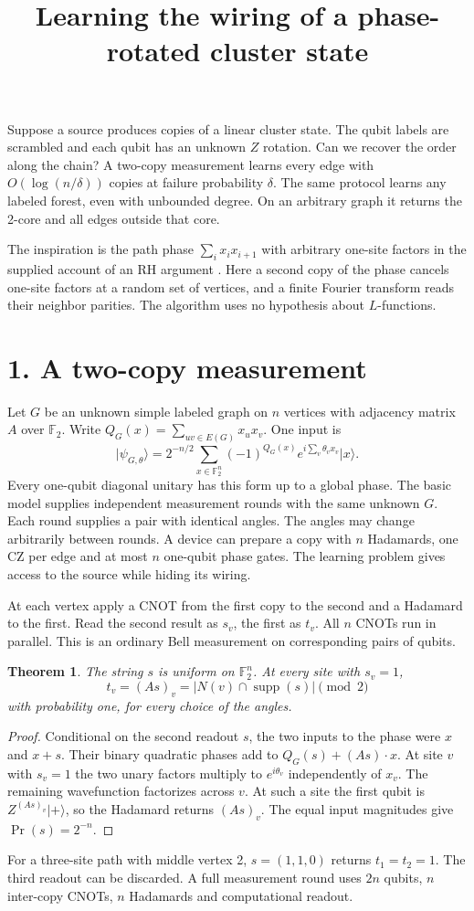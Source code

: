 \documentclass[11pt]{article}
\title{Learning the wiring of a phase-rotated cluster state}
\author{}\date{}
\newtheorem*{theorem}{Theorem}
\newcommand{\F}{\mathbb F_2}
\newcommand{\ket}[1]{\lvert #1\rangle}
\newcommand{\supp}{\operatorname{supp}}
\begin{document}
\maketitle
\vspace{-2.8em}
Suppose a source produces copies of a linear cluster state. The qubit
labels are scrambled and each qubit has an unknown $Z$ rotation. Can we
recover the order along the chain? A two-copy measurement learns every
edge with $O(\log(n/\delta))$ copies at failure probability $\delta$.
The same protocol learns any labeled forest, even with unbounded degree.
On an arbitrary graph it returns the 2-core and all edges outside that core.

The inspiration is the path phase $\sum_i x_ix_{i+1}$ with arbitrary
one-site factors in the supplied account of an RH argument \cite{remark}.
Here a second copy of the phase cancels one-site factors at a random
set of vertices, and a finite Fourier transform reads their neighbor parities.
The algorithm uses no hypothesis about $L$-functions.

\section*{1. A two-copy measurement}
Let $G$ be an unknown simple labeled graph on $n$ vertices with adjacency
matrix $A$ over $\F$. Write $Q_G(x)=\sum_{uv\in E(G)}x_ux_v$. One input is
\[
 \ket{\psi_{G,\theta}}=2^{-n/2}\sum_{x\in\F^n}
 (-1)^{Q_G(x)} e^{i\sum_v\theta_v x_v}\ket{x}.
\]
Every one-qubit diagonal unitary has this form up to a global phase. The
basic model supplies independent measurement rounds with the same unknown
$G$. Each round supplies a pair with identical angles. The angles may
change arbitrarily between rounds. A device can prepare a copy with
$n$ Hadamards, one CZ per edge and at most $n$ one-qubit phase gates.
The learning problem gives access to the source while hiding its wiring.

At each vertex apply a CNOT from the first copy to the second and a
Hadamard to the first. Read the second result as $s_v$, the first as $t_v$.
All $n$ CNOTs run in parallel. This is an ordinary Bell measurement on
corresponding pairs of qubits.
\begin{theorem}
The string $s$ is uniform on $\F^n$. At every site with $s_v=1$,
\[
 t_v=(As)_v=\big|N(v)\cap\supp(s)\big|\pmod 2
\]
with probability one, for every choice of the angles.
\end{theorem}
\begin{proof}
Conditional on the second readout $s$, the two inputs to the phase were
$x$ and $x+s$. Their binary quadratic phases add to
$Q_G(s)+(As)\cdot x$. At site $v$ with $s_v=1$ the two unary factors
multiply to $e^{i\theta_v}$ independently of $x_v$. The remaining
wavefunction factorizes across $v$. At such a site the first qubit is
$Z^{(As)_v}\ket{+}$, so the Hadamard returns $(As)_v$. The equal
input magnitudes give $\Pr(s)=2^{-n}$.
\end{proof}
For a three-site path with middle vertex 2, $s=(1,1,0)$ returns $t_1=t_2=1$.
The third readout can be discarded. A full measurement round uses $2n$
qubits, $n$ inter-copy CNOTs, $n$ Hadamards and computational readout.
\end{document}
